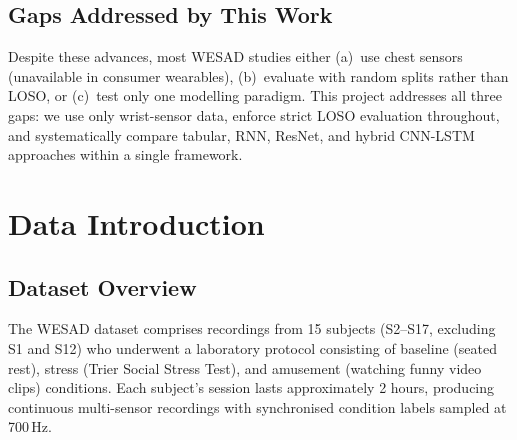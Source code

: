 \documentclass[11pt]{article}
\begin{document}
\subsection{Gaps Addressed by This Work}
Despite these advances, most WESAD studies either (a)~use chest sensors (unavailable in consumer wearables), (b)~evaluate with random splits rather than LOSO, or (c)~test only one modelling paradigm.
This project addresses all three gaps: we use only wrist-sensor data, enforce strict LOSO evaluation throughout, and systematically compare tabular, RNN, ResNet, and hybrid CNN-LSTM approaches within a single framework.


\section{Data Introduction}
\label{sec:data}

\subsection{Dataset Overview}
The WESAD dataset comprises recordings from 15 subjects (S2--S17, excluding S1 and S12) who underwent a laboratory protocol consisting of baseline (seated rest), stress (Trier Social Stress Test), and amusement (watching funny video clips) conditions.
Each subject's session lasts approximately 2 hours, producing continuous multi-sensor recordings with synchronised condition labels sampled at 700\,Hz.
\end{document}
